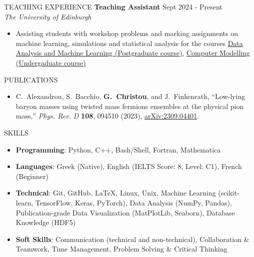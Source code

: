 \documentclass{resume} %
\begin{document}
        \begin{rSection}{TEACHING EXPERIENCE}
                \textbf{Teaching Assistant} \hfill Sept 2024 - Present\\
                {\it The University of Edinburgh}
                \begin{itemize}
                        \itemsep -3pt {} 
                        \item Assisting students with workshop problems and marking assignments on machine learning, simulations and statistical analysis for the courses \href{http://www.drps.ed.ac.uk/24-25/dpt/cxpgph11105.htm}{Data Analysis and Machine Learning (Postgraduate course)}, \href{http://www.drps.ed.ac.uk/24-25/dpt/cxphys09057.htm}{Computer Modelling (Undergaduate course)}
                \end{itemize}
        \end{rSection}

        \bigbreak

        \begin{rSection}{PUBLICATIONS}
                \begin{itemize}
                        \item C.~Alexandrou, S.~Bacchio, \textbf{G.~Christou}, and J.~Finkenrath, ``Low-lying baryon masses using twisted mass fermions ensembles at the physical pion mass,'' \textit{Phys. Rev. D} \textbf{108}, 094510 (2023), \href{https://arxiv.org/abs/2309.04401}{arXiv:2309.04401}.
                \end{itemize}
        \end{rSection}
        

        \bigbreak

        \begin{rSection}{SKILLS}
                \begin{itemize}
                        \itemsep -3pt {} 
                        \item \textbf{Programming}: Python, C++, Bash/Shell, Fortran, Mathematica
                        \item \textbf{Languages}: Greek (Native), English (IELTS Score: 8, Level: C1), French (Beginner)
                        \item \textbf{Technical}: Git, GitHub, \LaTeX, Linux, Unix, Machine Learning (scikit-learn, TensorFlow, Keras, PyTorch), Data Analysis (NumPy, Pandas), Publication-grade Data Visualization (MatPlotLib, Seaborn), Database Knowledge (HDF5)
                        \item \textbf{Soft Skills}: Communication (technical and non-technical), Collaboration \& Teamwork, Time Management, Problem Solving \& Critical Thinking
                \end{itemize}
        \end{rSection}
\end{document}
